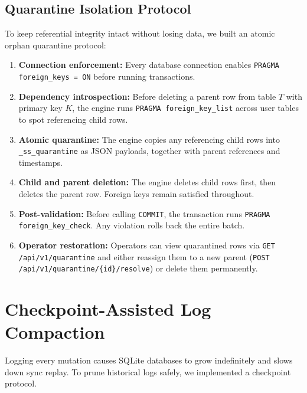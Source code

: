 \documentclass[conference]{IEEEtran}
\begin{document}
\subsection{Quarantine Isolation Protocol}
To keep referential integrity intact without losing data, we built an atomic orphan quarantine protocol:
\begin{enumerate}
    \item \textbf{Connection enforcement:} Every database connection enables \texttt{PRAGMA foreign\_keys = ON} before running transactions.
    \item \textbf{Dependency introspection:} Before deleting a parent row from table $T$ with primary key $K$, the engine runs \texttt{PRAGMA foreign\_key\_list} across user tables to spot referencing child rows.
    \item \textbf{Atomic quarantine:} The engine copies any referencing child rows into \texttt{\_ss\_quarantine} as JSON payloads, together with parent references and timestamps.
    \item \textbf{Child and parent deletion:} The engine deletes child rows first, then deletes the parent row. Foreign keys remain satisfied throughout.
    \item \textbf{Post-validation:} Before calling \texttt{COMMIT}, the transaction runs \texttt{PRAGMA foreign\_key\_check}. Any violation rolls back the entire batch.
    \item \textbf{Operator restoration:} Operators can view quarantined rows via \texttt{GET /api/v1/quarantine} and either reassign them to a new parent (\texttt{POST /api/v1/quarantine/\{id\}/resolve}) or delete them permanently.
\end{enumerate}

\section{Checkpoint-Assisted Log Compaction}

Logging every mutation causes SQLite databases to grow indefinitely and slows down sync replay. To prune historical logs safely, we implemented a checkpoint protocol.
\end{document}
